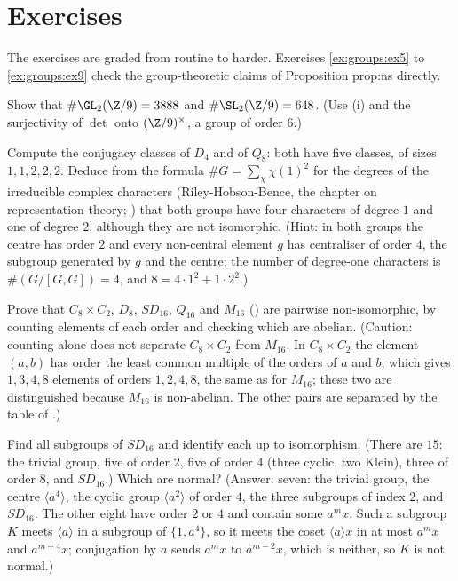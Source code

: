 \section{Exercises}\label{sec:groups:exercises}

The exercises are graded from routine to harder. Exercises \ref{ex:groups:ex5} to \ref{ex:groups:ex9} check the group-theoretic claims of Proposition prop:ns
directly.

\begin{exercise}\label{ex:groups:ex1}
Show that $\#\GL_2(\Z/9)=3888$ and $\#\SL_2(\Z/9)=648$. (Use (i) and the surjectivity of $\det$ onto $(\Z/9)^\times$, a group of order $6$.)
\end{exercise}

\begin{exercise}\label{ex:groups:ex2}
Compute the conjugacy classes of $D_4$ and of $Q_8$: both have five classes, of sizes $1,1,2,2,2$. Deduce from the formula $\#G=\sum_\chi\chi(1)^2$ for the
degrees of the irreducible complex characters (Riley-Hobson-Bence, the chapter on representation theory; ) that both groups have four characters of degree $1$ and one of
degree $2$, although they are not isomorphic.
(Hint: in both groups the centre has order $2$ and every non-central element $g$ has centraliser of order $4$, the subgroup generated by $g$ and the centre;
the number of degree-one characters is $\#(G/[G,G])=4$, and $8=4\cdot1^2+1\cdot2^2$.)
\end{exercise}

\begin{exercise}\label{ex:groups:ex3}
Prove that $C_8\times C_2$, $D_8$, $SD_{16}$, $Q_{16}$ and $M_{16}$ () are pairwise non-isomorphic, by counting elements of each order and checking which are abelian.
(Caution: counting alone does not separate $C_8\times C_2$ from $M_{16}$. In $C_8\times C_2$ the element $(a,b)$ has order the least common multiple of the orders
of $a$ and $b$, which gives $1,3,4,8$ elements of orders $1,2,4,8$, the same as for $M_{16}$; these two are distinguished because $M_{16}$ is non-abelian.
The other pairs are separated by the table of .)
\end{exercise}

\begin{exercise}\label{ex:groups:ex4}
Find all subgroups of $SD_{16}$ and identify each up to isomorphism. (There are $15$: the trivial group, five of order $2$, five of order $4$ (three cyclic, two
Klein), three of order $8$, and $SD_{16}$.) Which are normal? (Answer: seven: the trivial group, the centre $\langle a^4\rangle$, the cyclic group $\langle a^2\rangle$ of
order $4$, the three subgroups of index $2$, and $SD_{16}$. The other eight have order $2$ or $4$ and contain some $a^mx$. Such a
subgroup $K$ meets $\langle a\rangle$ in a subgroup of $\{1,a^4\}$, so it meets the coset $\langle a\rangle x$ in at most $a^mx$ and $a^{m+4}x$; conjugation by $a$ sends $a^mx$ to
$a^{m-2}x$, which is neither, so $K$ is not normal.)
\end{exercise}

